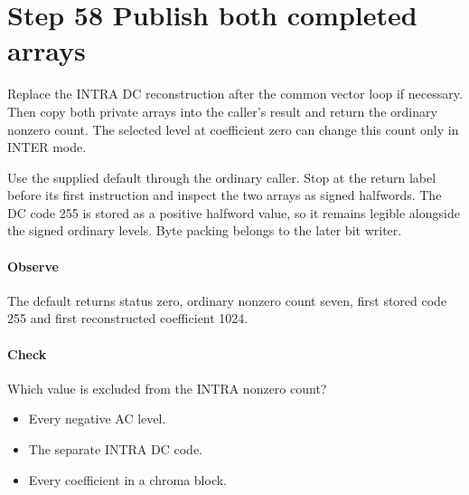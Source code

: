 \section{Step 58 Publish both completed arrays}\label{h263-quant-s08}
Replace the INTRA DC reconstruction after the common vector loop if necessary.
Then copy both private arrays into the caller's result and return the ordinary
nonzero count. The selected level at coefficient zero can change this count only
in INTER mode.

Use the supplied default through the ordinary caller. Stop at the return label
before its first instruction and inspect the two arrays as signed halfwords.
The DC code 255 is stored as a positive halfword value, so it remains legible
alongside the signed ordinary levels. Byte packing belongs to the later bit writer.

\paragraph{Observe} The default returns status zero, ordinary nonzero count
seven, first stored code 255 and first reconstructed coefficient 1024.
\paragraph{Check} Which value is excluded from the INTRA nonzero count?
\begin{itemize}
  \item[A.] Every negative AC level.
  \item[B.] The separate INTRA DC code.
  \item[C.] Every coefficient in a chroma block.
\end{itemize}
